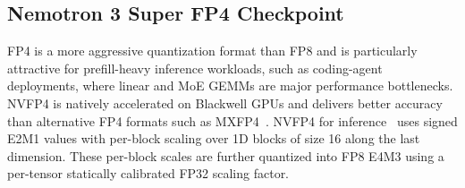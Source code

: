 \subsection{Nemotron 3 Super FP4 Checkpoint}

FP4 is a more aggressive quantization format than FP8 and is particularly attractive for prefill-heavy inference workloads, such as coding-agent deployments, where linear and MoE GEMMs are major performance bottlenecks. NVFP4 is natively accelerated on Blackwell GPUs and delivers better accuracy than alternative FP4 formats such as MXFP4~\citep{nvfp4_mxfp4}. NVFP4 for inference~\citep{nvpfp4_ptq_default} uses signed E2M1 values with per-block scaling over 1D blocks of size 16 along the last dimension. These per-block scales are further quantized into FP8 E4M3 using a per-tensor statically calibrated FP32 scaling factor. %



